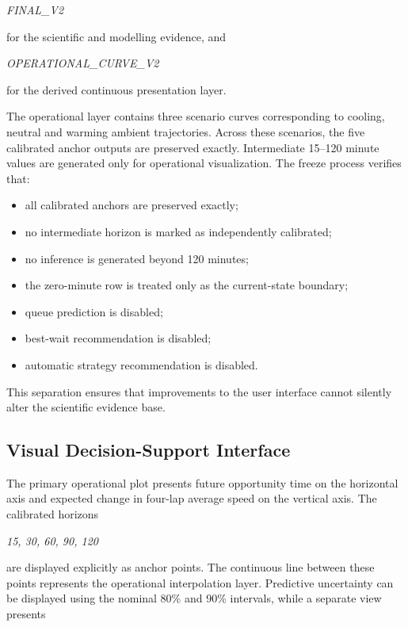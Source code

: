 \begin{center}\textit{FINAL\_V2}\end{center}

for the scientific and modelling evidence, and

\begin{center}\textit{OPERATIONAL\_CURVE\_V2}\end{center}

for the derived continuous presentation layer.

The operational layer contains three scenario curves corresponding to cooling, neutral and warming ambient trajectories. Across these scenarios, the five calibrated anchor outputs are preserved exactly. Intermediate 15--120 minute values are generated only for operational visualization. The freeze process verifies that:

\begin{itemize}
\item all calibrated anchors are preserved exactly;
\item no intermediate horizon is marked as independently calibrated;
\item no inference is generated beyond 120 minutes;
\item the zero-minute row is treated only as the current-state boundary;
\item queue prediction is disabled;
\item best-wait recommendation is disabled;
\item automatic strategy recommendation is disabled.
\end{itemize}

This separation ensures that improvements to the user interface cannot silently alter the scientific evidence base.

\subsection{Visual Decision-Support Interface}
The primary operational plot presents future opportunity time on the horizontal axis and expected change in four-lap average speed on the vertical axis. The calibrated horizons

\begin{center}\textit{15, 30, 60, 90, 120}\end{center}

are displayed explicitly as anchor points. The continuous line between these points represents the operational interpolation layer. Predictive uncertainty can be displayed using the nominal 80\% and 90\% intervals, while a separate view presents

